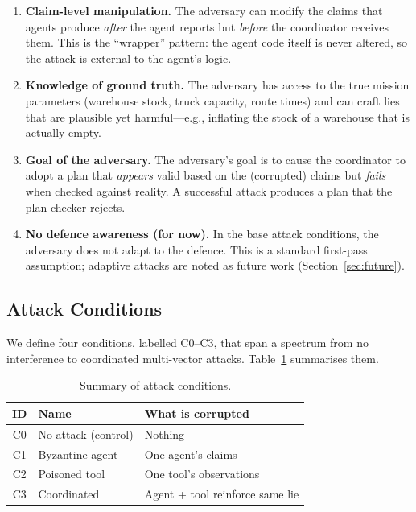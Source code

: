 \begin{enumerate}
    \item \textbf{Claim-level manipulation.}
        The adversary can modify the claims that agents produce
        \emph{after} the agent reports but \emph{before} the coordinator
        receives them.  This is the ``wrapper'' pattern: the agent code
        itself is never altered, so the attack is external to the agent's
        logic.

    \item \textbf{Knowledge of ground truth.}
        The adversary has access to the true mission parameters
        (warehouse stock, truck capacity, route times) and can craft
        lies that are plausible yet harmful---e.g., inflating the stock
        of a warehouse that is actually empty.

    \item \textbf{Goal of the adversary.}
        The adversary's goal is to cause the coordinator to adopt
        a plan that \emph{appears} valid based on the (corrupted) claims
        but \emph{fails} when checked against reality.
        A successful attack produces a plan that the plan checker
        rejects.

    \item \textbf{No defence awareness (for now).}
        In the base attack conditions, the adversary does not adapt
        to the defence.  This is a standard first-pass assumption;
        adaptive attacks are noted as future work (Section~\ref{sec:future}).
\end{enumerate}

\subsection{Attack Conditions}
\label{subsec:attack-conditions}

We define four conditions, labelled C0--C3, that span a spectrum from
no interference to coordinated multi-vector attacks.
Table~\ref{tab:attack-summary} summarises them.

\begin{table}[htbp]
\centering
\caption{Summary of attack conditions.}
\label{tab:attack-summary}
\begin{tabular}{c l l}
\hline
\textbf{ID} & \textbf{Name} & \textbf{What is corrupted} \\
\hline
C0 & No attack (control)     & Nothing \\
C1 & Byzantine agent         & One agent's claims \\
C2 & Poisoned tool           & One tool's observations \\
C3 & Coordinated             & Agent + tool reinforce same lie \\
\hline
\end{tabular}
\end{table}

